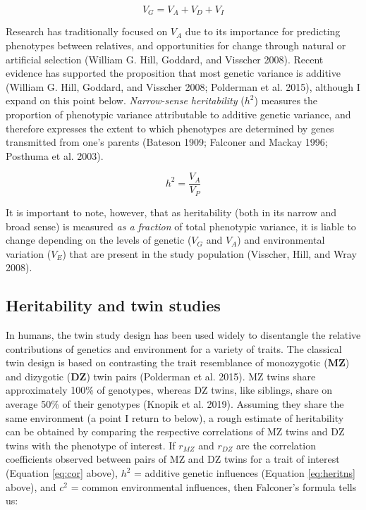 \documentclass[
]{book}
\begin{document}
\begin{equation}
V_G = V_A + V_D + V_I \label{eq:gendecomp}
\end{equation}

Research has traditionally focused on \(V_A\) due to its importance for predicting phenotypes between relatives, and opportunities for change through natural or artificial selection (William G. Hill, Goddard, and Visscher 2008). Recent evidence has supported the proposition that most genetic variance is additive (William G. Hill, Goddard, and Visscher 2008; Polderman et al. 2015), although I expand on this point below. \emph{Narrow-sense heritability} (\(h^2\)) measures the proportion of phenotypic variance attributable to additive genetic variance, and therefore expresses the extent to which phenotypes are determined by genes transmitted from one's parents (Bateson 1909; Falconer and Mackay 1996; Posthuma et al. 2003).

\begin{equation}
h^2 = \frac{V_A}{V_P} \label{eq:heritns}
\end{equation}

It is important to note, however, that as heritability (both in its narrow and broad sense) is measured \emph{as a fraction} of total phenotypic variance, it is liable to change depending on the levels of genetic (\(V_G\) and \(V_A\)) and environmental variation (\(V_E\)) that are present in the study population (Visscher, Hill, and Wray 2008).

\hypertarget{heritability-and-twin-studies}{%
\subsection{Heritability and twin studies}\label{heritability-and-twin-studies}}

In humans, the twin study design has been used widely to disentangle the relative contributions of genetics and environment for a variety of traits. The classical twin design is based on contrasting the trait resemblance of monozygotic (\textbf{MZ}) and dizygotic (\textbf{DZ}) twin pairs (Polderman et al. 2015). MZ twins share approximately 100\% of genotypes, whereas DZ twins, like siblings, share on average 50\% of their genotypes (Knopik et al. 2019). Assuming they share the same environment (a point I return to below), a rough estimate of heritability can be obtained by comparing the respective correlations of MZ twins and DZ twins with the phenotype of interest. If \(r_{MZ}\) and \(r_{DZ}\) are the correlation coefficients observed between pairs of MZ and DZ twins for a trait of interest (Equation \eqref{eq:cor} above), \(h^2\) = additive genetic influences (Equation \eqref{eq:heritns} above), and \(c^2\) = common environmental influences, then Falconer's formula tells us:
\end{document}
